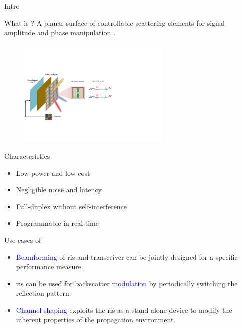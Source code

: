 \documentclass[presentation,xcolor={table},9pt]{beamer}
\begin{document}
\begin{section}{Intro}
	\begin{frame}{What is ?}
		A planar surface of controllable scattering elements for signal amplitude and phase manipulation \cite{Wu2020}.
		\begin{figure}
			\centering
			\includegraphics[width=0.65\textwidth]{../assets/viva/ris_architecture.pdf}
			\label{fg:ris_architecture}
		\end{figure}
		\begin{block}{Characteristics}
			\begin{itemize}
				\item Low-power and low-cost
				\item Negligible noise and latency
				\item Full-duplex without self-interference
				\item Programmable in real-time
			\end{itemize}
		\end{block}
	\end{frame}

	\begin{frame}{Use cases of }
		\begin{itemize}
			\item \textcolor{blue}{Beamforming} of \gls{ris} and transceiver can be jointly designed for a specific performance measure.
			\item \gls{ris} can be used for backscatter \textcolor{blue}{modulation} by periodically switching the reflection pattern.
			\item \textcolor{blue}{Channel shaping} exploits the \gls{ris} as a stand-alone device to modify the inherent properties of the propagation environment.
		\end{itemize}


\end{frame}
\end{section}
\end{document}
